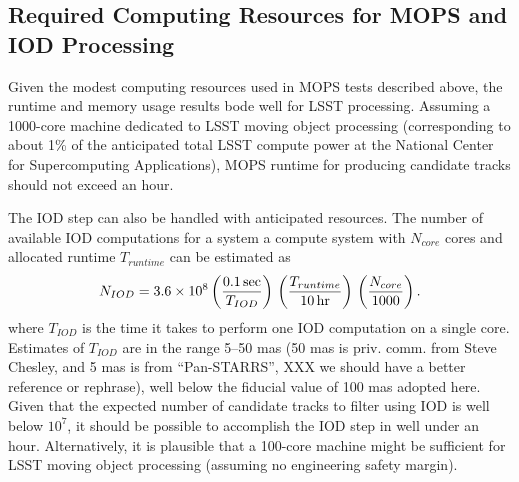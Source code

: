 \subsection{Required Computing Resources for MOPS and IOD Processing}

Given the modest computing resources used in MOPS tests described above, the runtime and memory
usage results bode well for LSST processing. Assuming a 1000-core machine dedicated to LSST moving
object processing (corresponding to about 1\% of the anticipated total LSST compute power at the
National Center for Supercomputing Applications), MOPS runtime for producing
candidate tracks should not exceed an hour.

The IOD step can also be handled with anticipated resources. The number of available IOD computations
for a system a compute system with $N_{core}$ cores and allocated runtime $T_{runtime}$ can be estimated
as
\begin{equation}
  N_{IOD} = 3.6\times10^8 \left({ 0.1\,{\rm sec} \over T_{IOD}}\right) \,
                                         \left({ T_{runtime}  \over 10\,{\rm hr} }\right) \,
                                         \left({ N_{core}  \over 1000}\right).
\end{equation}
where $T_{IOD}$ is the time it takes to perform one IOD computation on a single core. Estimates
of $T_{IOD}$ are in the range 5--50 mas (50 mas is priv. comm. from Steve Chesley, and 5 mas is
from ``Pan-STARRS'', XXX we should have a better reference or rephrase), well below the fiducial
value of 100 mas adopted here. Given that the expected number of candidate tracks to filter using
IOD is well below $10^7$, it should be possible to accomplish the IOD step in well under an hour.
Alternatively, it is plausible that a 100-core machine might be sufficient for LSST moving object
processing (assuming no engineering safety margin).
